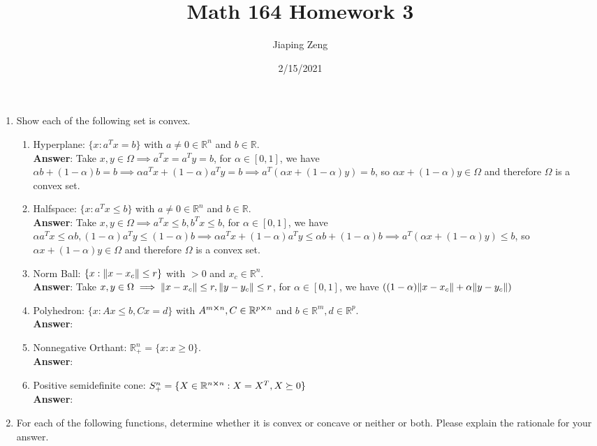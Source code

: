 \documentclass{article}
\title{Math 164 Homework 3}
\date{2/15/2021}
\author{Jiaping Zeng}
\begin{document}
\maketitle

\begin{enumerate}
      \item Show each of the following set is convex.
            \begin{enumerate}
                  \item Hyperplane: $\{x:a^Tx=b\}$ with $a\neq 0\in\mathbb{R}^n$ and $b\in\mathbb{R}$.\\
                        \textbf{Answer}: Take $x,y\in\Omega\implies a^Tx=a^Ty=b$, for $\alpha\in[0,1]$, we have $\alpha b+(1-\alpha)b=b\implies\alpha a^Tx+(1-\alpha) a^Ty=b\implies a^T(\alpha x+(1-\alpha)y)=b$, so $\alpha x+(1-\alpha)y\in\Omega$ and therefore $\Omega$ is a convex set.
                  \item Halfspace: $\{x:a^Tx\leq b\}$ with $a\neq 0\in\mathbb{R}^n$ and $b\in\mathbb{R}$.\\
                        \textbf{Answer}: Take $x,y\in\Omega\implies a^Tx\leq b,b^Tx\leq b$, for $\alpha\in[0,1]$, we have $\alpha a^Tx\leq\alpha b,(1-\alpha)a^Ty\leq (1-\alpha)b\implies\alpha a^Tx+(1-\alpha)a^Ty\leq\alpha b+(1-\alpha)b\implies a^T(\alpha x+(1-\alpha)y)\leq b$, so $\alpha x+(1-\alpha)y\in\Omega$ and therefore $\Omega$ is a convex set.
                  \item Norm Ball: $\{x:\norm{x-x_c}\leq r\}$ with $>0$ and $x_c\in\mathbb{R}^n$.\\
                        \textbf{Answer}: Take $x,y\in\Omega\implies\norm{x-x_c}\leq r,\norm{y-y_c}\leq r$, for $\alpha\in[0,1]$, we have $((1-\alpha)\norm{x-x_c}+\alpha\norm{y-y_c})$
                  \item Polyhedron: $\{x:Ax\leq b,Cx=d\}$ with $A^{m\cross n},C\in\mathbb{R}^{p\cross n}$ and $b\in\mathbb{R}^m,d\in\mathbb{R}^p$.\\
                        \textbf{Answer}:
                  \item Nonnegative Orthant: $\mathbb{R}_+^n=\{x:x\geq 0\}$.\\
                        \textbf{Answer}:
                  \item Positive semidefinite cone: $S_+^n=\{X\in\mathbb{R}^{n\cross n}:X=X^T,X\succeq 0\}$\\
                        \textbf{Answer}:
            \end{enumerate}
      \item For each of the following functions, determine whether it is convex or concave or neither or both. Please explain the rationale for your answer.

\end{enumerate}
\end{document}
